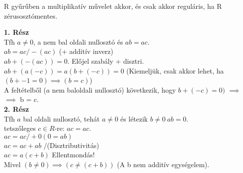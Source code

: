 \documentclass{beamer}
\begin{document}
\begin{frame}
\begin{tcolorbox}[title={Lemma: Nullosztó és regularitás}]
R gyűrűben a multiplikatív művelet akkor, és csak akkor reguláris, ha R zérusosztómentes.
\end{tcolorbox}

\begin{tcolorbox}[title={Bizonyítás}]
\textbf{1. Rész}\\
Tfh $a \neq 0$, a nem bal oldali nullosztó és $ab = ac$.\\
$ab = ac  / -(ac)$ (+ additív inverz)\\
$ab + (-(ac)) = 0$. Előjel szabály + disztri.\\
$ab + (a(-c)) = a(b+(-c)) = 0$ (Kiemeljük, csak akkor lehet, ha $(b + -1 = 0) \implies (b = c)$)\\
A feltételből ($a$ nem baloldali nullosztó) következik, hogy $b + (-c) = 0)$ $\implies$\\
$\implies$ b = c.\\
\bigskip
\textbf{2. Rész}\\
Tfh $a$ bal oldali nullosztó, tehát $a \neq 0$ és létezik $b \neq 0\: ab = 0$.\\
tetszőleges $c \in R$-re: $ac = ac$.\\
$ac = ac / +0 (0 = ab)$\\
$ac = ac + ab$ /(Disztributivitás)\\
$ac = a(c + b)$ Ellentmondás!\\
Mivel $(b \neq 0) \implies (c \neq (c + b))$ (A b nem additív egységelem).
\end{tcolorbox}
\end{frame}

\begin{frame}

\begin{tcolorbox}[title={Def.: Rendezett Integritási Tartomány}]
\end{tcolorbox}

\begin{tcolorbox}[title={Def.: Egységelemes Integritási Tartomány}]
\end{tcolorbox}
\end{frame}



\begin{frame}[plain]
\end{frame}
\end{document}
